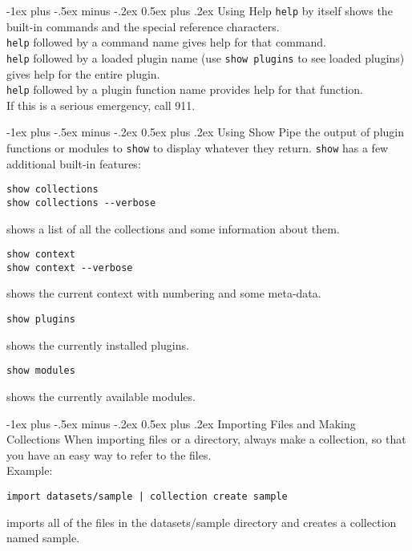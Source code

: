 \documentclass[10pt,landscape]{article}
\makeatletter
\renewcommand{\section}{\@startsection{section}{1}{0mm}%
                                {-1ex plus -.5ex minus -.2ex}%
                                {0.5ex plus .2ex}%
                                {\normalfont\large\bfseries}}
\makeatother
\begin{document}
\begin{multicols}{3}
\section{Using Help}
\verb!help! by itself shows the built-in commands and the special reference characters.  \\
\verb!help! followed by a command name gives help for that command. \\
\verb!help! followed by a loaded plugin name (use \verb!show plugins! to see loaded plugins) gives help for the entire plugin. \\
\verb!help! followed by a plugin function name provides help for that function. \\
If this is a serious emergency, call 911.

\section{Using Show}
Pipe the output of plugin functions or modules to \verb!show! to display whatever they return.  \verb!show! has a few additional
built-in features:
\begin{verbatim}
show collections
show collections --verbose
\end{verbatim}
shows a list of all the collections and some information about them.
\begin{verbatim}
show context
show context --verbose
\end{verbatim}
shows the current context with numbering and some meta-data.
\begin{verbatim}
show plugins
\end{verbatim}
shows the currently installed plugins.
\begin{verbatim}
show modules
\end{verbatim}
shows the currently available modules.

\section{Importing Files and Making Collections}
When importing files or a directory, always make a collection, so that you have an easy way to refer to the files. \\
Example: 
\begin{verbatim}
import datasets/sample | collection create sample 
\end{verbatim}
imports all of the files in the datasets/sample directory and creates a collection named sample.

\end{multicols}
\end{document}
